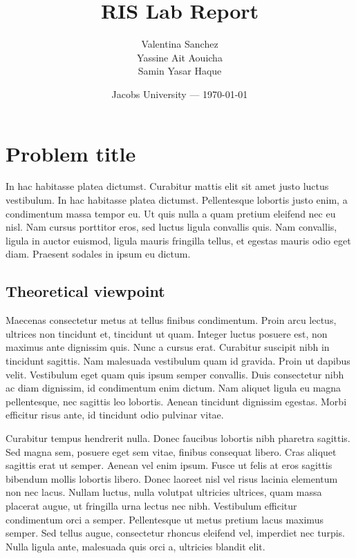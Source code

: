 \documentclass{article}
\title{RIS Lab Report} %
\author{Valentina Sanchez\\ Yassine Ait Aouicha \\ Samin Yasar Haque } %
\date{Jacobs University --- \today} %
\begin{document}
\maketitle %



\section{Problem title} %

In hac habitasse platea dictumst. Curabitur mattis elit sit amet justo luctus vestibulum. In hac habitasse platea dictumst. Pellentesque lobortis justo enim, a condimentum massa tempor eu. Ut quis nulla a quam pretium eleifend nec eu nisl. Nam cursus porttitor eros, sed luctus ligula convallis quis. Nam convallis, ligula in auctor euismod, ligula mauris fringilla tellus, et egestas mauris odio eget diam. Praesent sodales in ipsum eu dictum.


\subsection{Theoretical viewpoint}

Maecenas consectetur metus at tellus finibus condimentum. Proin arcu lectus, ultrices non tincidunt et, tincidunt ut quam. Integer luctus posuere est, non maximus ante dignissim quis. Nunc a cursus erat. Curabitur suscipit nibh in tincidunt sagittis. Nam malesuada vestibulum quam id gravida. Proin ut dapibus velit. Vestibulum eget quam quis ipsum semper convallis. Duis consectetur nibh ac diam dignissim, id condimentum enim dictum. Nam aliquet ligula eu magna pellentesque, nec sagittis leo lobortis. Aenean tincidunt dignissim egestas. Morbi efficitur risus ante, id tincidunt odio pulvinar vitae.

Curabitur tempus hendrerit nulla. Donec faucibus lobortis nibh pharetra sagittis. Sed magna sem, posuere eget sem vitae, finibus consequat libero. Cras aliquet sagittis erat ut semper. Aenean vel enim ipsum. Fusce ut felis at eros sagittis bibendum mollis lobortis libero. Donec laoreet nisl vel risus lacinia elementum non nec lacus. Nullam luctus, nulla volutpat ultricies ultrices, quam massa placerat augue, ut fringilla urna lectus nec nibh. Vestibulum efficitur condimentum orci a semper. Pellentesque ut metus pretium lacus maximus semper. Sed tellus augue, consectetur rhoncus eleifend vel, imperdiet nec turpis. Nulla ligula ante, malesuada quis orci a, ultricies blandit elit.
\end{document}
